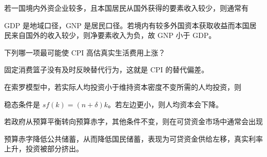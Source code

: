 \begin{question}
若一国境内外资企业较多，且本国居民从国外获得的要素收入较少，则通常有
\begin{choiceoptions}[2]
\end{choiceoptions}
\begin{solution}
GDP 是地域口径，GNP 是居民口径。若境内有较多外国资本获取收益而本国居民来自国外的收入较少，则净要素收入为负，故 GNP 小于 GDP。
\end{solution}
\end{question}

\begin{question}
下列哪一项最可能使 CPI 高估真实生活费用上涨？
\begin{choiceoptions}[2]
\end{choiceoptions}
\begin{solution}
固定消费篮子没有及时反映替代行为，这就是 CPI 的替代偏差。
\end{solution}
\end{question}

\begin{question}
在索罗模型中，若实际人均投资小于维持资本密度不变所需的人均投资，则
\begin{choiceoptions}[2]
\end{choiceoptions}
\begin{solution}
稳态条件是 $sf(k)=(n+\delta)k$。若左边更小，则人均资本会下降。
\end{solution}
\end{question}

\begin{question}
若政府从预算平衡转向预算赤字，其他条件不变，则在可贷资金市场中通常会出现
\begin{choiceoptions}[2]
\end{choiceoptions}
\begin{solution}
预算赤字降低公共储蓄，从而降低国民储蓄，表现为可贷资金供给左移，真实利率上升，投资被部分挤出。
\end{solution}
\end{question}

